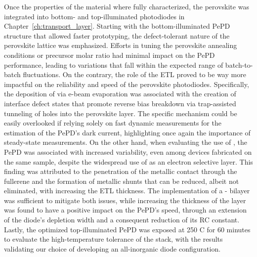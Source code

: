 Once the properties of the material where fully characterized, the  perovskite was integrated into bottom- and top-illuminated photodiodes in Chapter~\ref{ch:transport_layer}. Starting with the bottom-illuminated PePD structure that allowed faster prototyping, the defect-tolerant nature of the perovskite lattice was emphasized. Efforts in tuning the perovskite annealing conditions or precursor molar ratio had minimal impact on the PePD performance, leading to variations that fall within the expected range of batch-to-batch fluctuations. On the contrary, the role of the ETL proved to be way more impactful on the reliability and speed of the perovskite photodiodes. Specifically, the deposition of  via e-beam evaporation was associated with the creation of interface defect states that promote reverse bias breakdown via trap-assisted tunneling of holes into the perovskite layer. The specific mechanism could be easily overlooked if relying solely on fast dynamic measurements for the estimation of the PePD's dark current, highlighting once again the importance of steady-state measurements. On the other hand, when evaluating the use of , the PePD was associated with increased variability, even among devices fabricated on the same sample, despite the widespread use of  as an electron selective layer. This finding was attributed to the penetration of the metallic contact through the fullerene and the formation of metallic shunts that can be reduced, albeit not eliminated, with increasing the ETL thickness. The implementation of a - bilayer was sufficient to mitigate both issues, while increasing  the thickness of the  layer was found to have a positive impact on the PePD's speed, through an extension of the diode's depletion width and a consequent reduction of its RC constant. Lastly, the optimized top-illuminated PePD was exposed at 250 \degree C for 60 minutes to evaluate the high-temperature tolerance of the stack, with the results validating our choice of developing an all-inorganic diode configuration.


